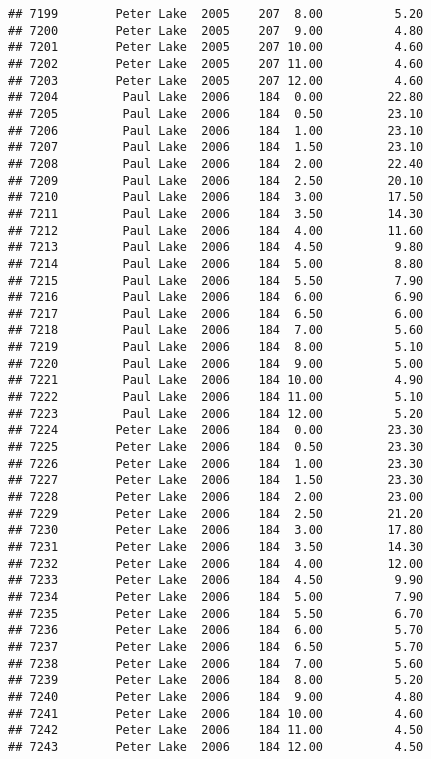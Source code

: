 \documentclass[
]{article}
\begin{document}
\begin{verbatim}
## 7199        Peter Lake  2005    207  8.00          5.20
## 7200        Peter Lake  2005    207  9.00          4.80
## 7201        Peter Lake  2005    207 10.00          4.60
## 7202        Peter Lake  2005    207 11.00          4.60
## 7203        Peter Lake  2005    207 12.00          4.60
## 7204         Paul Lake  2006    184  0.00         22.80
## 7205         Paul Lake  2006    184  0.50         23.10
## 7206         Paul Lake  2006    184  1.00         23.10
## 7207         Paul Lake  2006    184  1.50         23.10
## 7208         Paul Lake  2006    184  2.00         22.40
## 7209         Paul Lake  2006    184  2.50         20.10
## 7210         Paul Lake  2006    184  3.00         17.50
## 7211         Paul Lake  2006    184  3.50         14.30
## 7212         Paul Lake  2006    184  4.00         11.60
## 7213         Paul Lake  2006    184  4.50          9.80
## 7214         Paul Lake  2006    184  5.00          8.80
## 7215         Paul Lake  2006    184  5.50          7.90
## 7216         Paul Lake  2006    184  6.00          6.90
## 7217         Paul Lake  2006    184  6.50          6.00
## 7218         Paul Lake  2006    184  7.00          5.60
## 7219         Paul Lake  2006    184  8.00          5.10
## 7220         Paul Lake  2006    184  9.00          5.00
## 7221         Paul Lake  2006    184 10.00          4.90
## 7222         Paul Lake  2006    184 11.00          5.10
## 7223         Paul Lake  2006    184 12.00          5.20
## 7224        Peter Lake  2006    184  0.00         23.30
## 7225        Peter Lake  2006    184  0.50         23.30
## 7226        Peter Lake  2006    184  1.00         23.30
## 7227        Peter Lake  2006    184  1.50         23.30
## 7228        Peter Lake  2006    184  2.00         23.00
## 7229        Peter Lake  2006    184  2.50         21.20
## 7230        Peter Lake  2006    184  3.00         17.80
## 7231        Peter Lake  2006    184  3.50         14.30
## 7232        Peter Lake  2006    184  4.00         12.00
## 7233        Peter Lake  2006    184  4.50          9.90
## 7234        Peter Lake  2006    184  5.00          7.90
## 7235        Peter Lake  2006    184  5.50          6.70
## 7236        Peter Lake  2006    184  6.00          5.70
## 7237        Peter Lake  2006    184  6.50          5.70
## 7238        Peter Lake  2006    184  7.00          5.60
## 7239        Peter Lake  2006    184  8.00          5.20
## 7240        Peter Lake  2006    184  9.00          4.80
## 7241        Peter Lake  2006    184 10.00          4.60
## 7242        Peter Lake  2006    184 11.00          4.50
## 7243        Peter Lake  2006    184 12.00          4.50

\end{verbatim}
\end{document}
